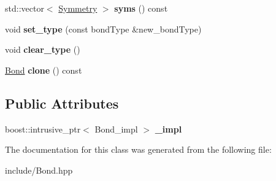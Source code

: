 \begin{DoxyCompactItemize}
std\+::vector$<$ \hyperlink{classcytnx_1_1Symmetry}{Symmetry} $>$ {\bfseries syms} () const
\item 
\mbox{\label{classcytnx_1_1Bond_ae6957c3902bf12fd27ab881db3fe5243}} 
void {\bfseries set\+\_\+type} (const bond\+Type \&new\+\_\+bond\+Type)
\item 
\mbox{\label{classcytnx_1_1Bond_a6272e30153df85944fc98bf5419dc1c8}} 
void {\bfseries clear\+\_\+type} ()
\item 
\mbox{\label{classcytnx_1_1Bond_a8c4d6443ffe7c3f3ecd8c474fd9a18eb}} 
\hyperlink{classcytnx_1_1Bond}{Bond} {\bfseries clone} () const
\end{DoxyCompactItemize}
\subsection*{Public Attributes}
\begin{DoxyCompactItemize}
\item 
\mbox{\label{classcytnx_1_1Bond_ab214ae754becae00b725618be195659c}} 
boost\+::intrusive\+\_\+ptr$<$ Bond\+\_\+impl $>$ {\bfseries \+\_\+impl}
\end{DoxyCompactItemize}


The documentation for this class was generated from the following file\+:\begin{DoxyCompactItemize}
\item 
include/Bond.\+hpp\end{DoxyCompactItemize}
